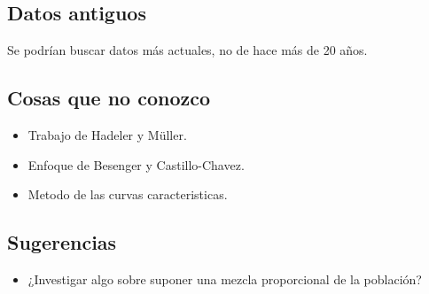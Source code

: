 \documentclass[
]{book}
\providecommand{\tightlist}{%
  \setlength{\itemsep}{0pt}\setlength{\parskip}{0pt}}
\begin{document}
\hypertarget{old}{%
\subsection{Datos antiguos}\label{old}}

Se podrían buscar datos más actuales, no de hace más de 20 años.

\hypertarget{desconocido}{%
\subsection{Cosas que no conozco}\label{desconocido}}

\begin{itemize}
\tightlist
\item
  Trabajo de Hadeler y Müller.
\item
  Enfoque de Besenger y Castillo-Chavez.
\item
  Metodo de las curvas caracteristicas.
\end{itemize}

\hypertarget{sug}{%
\subsection{Sugerencias}\label{sug}}

\begin{itemize}
\tightlist
\item
  ¿Investigar algo sobre suponer una mezcla proporcional de la población?
\end{itemize}

  
\end{document}
